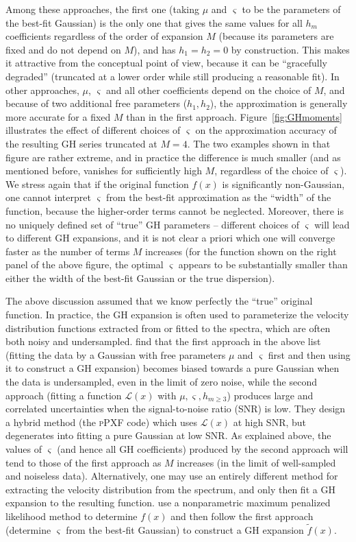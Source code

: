 \documentclass[12pt]{article}
\begin{document}
Among these approaches, the first one (taking $\mu$ and $\varsigma$ to be the parameters of the best-fit Gaussian) is the only one that gives the same values for all $h_m$ coefficients regardless of the order of expansion $M$ (because its parameters are fixed and do not depend on $M$), and has $h_1=h_2=0$ by construction. This makes it attractive from the conceptual point of view, because it can be ``gracefully degraded'' (truncated at a lower order while still producing a reasonable fit). In other approaches, $\mu$, $\varsigma$ and all other coefficients depend on the choice of $M$, and because of two additional free parameters ($h_1,h_2$), the approximation is generally more accurate for a fixed $M$ than in the first approach. Figure~\ref{fig:GHmoments} illustrates the effect of different choices of $\varsigma$ on the approximation accuracy of the resulting GH series truncated at $M=4$. The two examples shown in that figure are rather extreme, and in practice the difference is much smaller (and as mentioned before, vanishes for sufficiently high $M$, regardless of the choice of $\varsigma$).
We stress again that if the original function $f(x)$ is significantly non-Gaussian, one cannot interpret $\varsigma$ from the best-fit approximation as the ``width'' of the function, because the higher-order terms cannot be neglected. Moreover, there is no uniquely defined set of ``true'' GH parameters -- different choices of $\varsigma$ will lead to different GH expansions, and it is not clear a priori which one will converge faster as the number of terms $M$ increases (for the function shown on the right panel of the above figure, the optimal $\varsigma$ appears to be substantially smaller than either the width of the best-fit Gaussian or the true dispersion).

The above discussion assumed that we know perfectly the ``true'' original function. In practice, the GH expansion is often used to parameterize the velocity distribution functions extracted from or fitted to the spectra, which are often both noisy and undersampled.
\cite{CappellariEmsellem2004} find that the first approach in the above list (fitting the data by a Gaussian with free parameters $\mu$ and $\varsigma$ first and then using it to construct a GH expansion) becomes biased towards a pure Gaussian when the data is undersampled, even in the limit of zero noise, while the second approach (fitting a function $\mathscr L(x)$ with $\mu,\varsigma,h_{m\ge 3}$) produces large and correlated uncertainties when the signal-to-noise ratio (SNR) is low. They design a hybrid method (the \textsc{pPXF} code) which uses $\mathscr L(x)$ at high SNR, but degenerates into fitting a pure Gaussian at low SNR. As explained above, the values of $\varsigma$ (and hence all GH coefficients) produced by the second approach will tend to those of the first approach as $M$ increases (in the limit of well-sampled and noiseless data).
Alternatively, one may use an entirely different method for extracting the velocity distribution from the spectrum, and only then fit a GH expansion to the resulting function. \cite{Joseph2001} use a nonparametric maximum penalized likelihood method to determine $f(x)$ and then follow the first approach (determine $\varsigma$ from the best-fit Gaussian) to construct a GH expansion $\tilde f(x)$.
\end{document}
